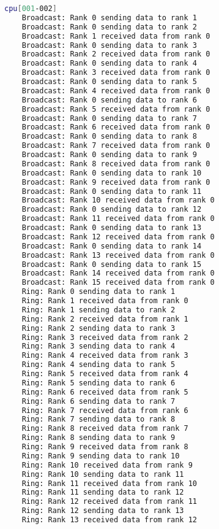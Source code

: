 \documentclass[11pt]{article}
\begin{document}
\begin{lstlisting}[language=bash,caption=Baobab Output]
    cpu[001-002]
    Broadcast: Rank 0 sending data to rank 1
    Broadcast: Rank 0 sending data to rank 2
    Broadcast: Rank 1 received data from rank 0
    Broadcast: Rank 0 sending data to rank 3
    Broadcast: Rank 2 received data from rank 0
    Broadcast: Rank 0 sending data to rank 4
    Broadcast: Rank 3 received data from rank 0
    Broadcast: Rank 0 sending data to rank 5
    Broadcast: Rank 4 received data from rank 0
    Broadcast: Rank 0 sending data to rank 6
    Broadcast: Rank 5 received data from rank 0
    Broadcast: Rank 0 sending data to rank 7
    Broadcast: Rank 6 received data from rank 0
    Broadcast: Rank 0 sending data to rank 8
    Broadcast: Rank 7 received data from rank 0
    Broadcast: Rank 0 sending data to rank 9
    Broadcast: Rank 8 received data from rank 0
    Broadcast: Rank 0 sending data to rank 10
    Broadcast: Rank 9 received data from rank 0
    Broadcast: Rank 0 sending data to rank 11
    Broadcast: Rank 10 received data from rank 0
    Broadcast: Rank 0 sending data to rank 12
    Broadcast: Rank 11 received data from rank 0
    Broadcast: Rank 0 sending data to rank 13
    Broadcast: Rank 12 received data from rank 0
    Broadcast: Rank 0 sending data to rank 14
    Broadcast: Rank 13 received data from rank 0
    Broadcast: Rank 0 sending data to rank 15
    Broadcast: Rank 14 received data from rank 0
    Broadcast: Rank 15 received data from rank 0
    Ring: Rank 0 sending data to rank 1
    Ring: Rank 1 received data from rank 0
    Ring: Rank 1 sending data to rank 2
    Ring: Rank 2 received data from rank 1
    Ring: Rank 2 sending data to rank 3
    Ring: Rank 3 received data from rank 2
    Ring: Rank 3 sending data to rank 4
    Ring: Rank 4 received data from rank 3
    Ring: Rank 4 sending data to rank 5
    Ring: Rank 5 received data from rank 4
    Ring: Rank 5 sending data to rank 6
    Ring: Rank 6 received data from rank 5
    Ring: Rank 6 sending data to rank 7
    Ring: Rank 7 received data from rank 6
    Ring: Rank 7 sending data to rank 8
    Ring: Rank 8 received data from rank 7
    Ring: Rank 8 sending data to rank 9
    Ring: Rank 9 received data from rank 8
    Ring: Rank 9 sending data to rank 10
    Ring: Rank 10 received data from rank 9
    Ring: Rank 10 sending data to rank 11
    Ring: Rank 11 received data from rank 10
    Ring: Rank 11 sending data to rank 12
    Ring: Rank 12 received data from rank 11
    Ring: Rank 12 sending data to rank 13
    Ring: Rank 13 received data from rank 12

\end{lstlisting}
\end{document}
